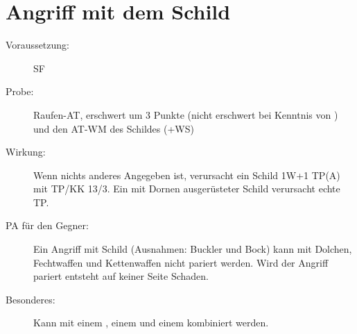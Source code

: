\section{Angriff mit dem Schild}
\label{aktion.angriff_mit_dem_schild}
\begin{description}
    \item[Voraussetzung:]
        SF 
    \item[Probe:]
        Raufen-AT, erschwert um 3 Punkte (nicht erschwert bei Kenntnis von ) und den AT-WM des Schildes (+WS)
    \item[Wirkung:]
        Wenn nichts anderes Angegeben ist, verursacht ein Schild 1W+1 TP(A) mit TP/KK 13/3.
        Ein mit Dornen ausgerüsteter Schild verursacht echte TP.
    \item[PA für den Gegner:]
        Ein Angriff mit Schild (Ausnahmen: Buckler und Bock) kann mit Dolchen, Fechtwaffen und Kettenwaffen nicht pariert werden.
        Wird der Angriff pariert entsteht auf keiner Seite Schaden.
    \item[Besonderes:]
        Kann mit einem , einem  und einem  kombiniert werden.
\end{description}
